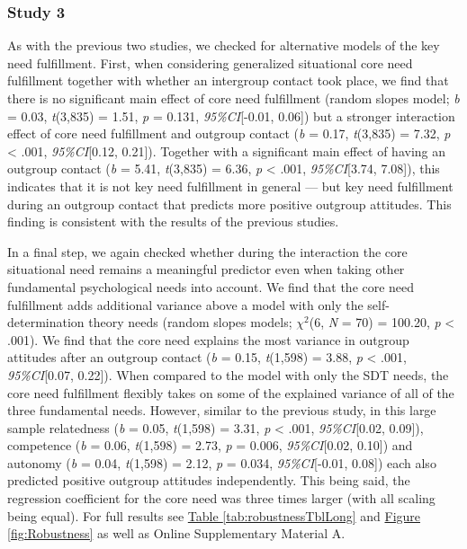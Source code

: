 \documentclass[man, 12pt, a4paper, mask]{apa7}
\theoremstyle{break}
\theoremstyle{plain}
\newcommand{\fgrref}[2][]{\hyperref[#2]{Figure \ref*{#2}#1}}
\newcommand{\tblref}[2][]{\hyperref[#2]{Table \ref*{#2}#1}}
\begin{document}
\subsubsection{Study 3}

As with the previous two studies, we checked for alternative models of
the key need fulfillment. First, when considering generalized
situational core need fulfillment together with whether an intergroup
contact took place, we find that there is no significant main effect of
core need fulfillment (random slopes model; \textit{b} = 0.03,
\textit{t}(3,835) = 1.51, \textit{p} = 0.131, \textit{95\%CI}{[}-0.01,
0.06{]}) but a stronger interaction effect of core need fulfillment and
outgroup contact (\textit{b} = 0.17, \textit{t}(3,835) = 7.32,
\textit{p} \textless{} .001, \textit{95\%CI}{[}0.12, 0.21{]}). Together
with a significant main effect of having an outgroup contact (\textit{b}
= 5.41, \textit{t}(3,835) = 6.36, \textit{p} \textless{} .001,
\textit{95\%CI}{[}3.74, 7.08{]}), this indicates that it is not key need
fulfillment in general --- but key need fulfillment during an outgroup
contact that predicts more positive outgroup attitudes. This finding is
consistent with the results of the previous studies.

In a final step, we again checked whether during the interaction the
core situational need remains a meaningful predictor even when taking
other fundamental psychological needs into account. We find that the
core need fulfillment adds additional variance above a model with only
the self-determination theory needs (random slopes models; \(\chi^2\)(6,
\textit{N} = 70) = 100.20, \textit{p} \textless{} .001). We find that
the core need explains the most variance in outgroup attitudes after an
outgroup contact (\textit{b} = 0.15, \textit{t}(1,598) = 3.88,
\textit{p} \textless{} .001, \textit{95\%CI}{[}0.07, 0.22{]}). When
compared to the model with only the SDT needs, the core need fulfillment
flexibly takes on some of the explained variance of all of the three
fundamental needs. However, similar to the previous study, in this large
sample relatedness (\textit{b} = 0.05, \textit{t}(1,598) = 3.31,
\textit{p} \textless{} .001, \textit{95\%CI}{[}0.02, 0.09{]}),
competence (\textit{b} = 0.06, \textit{t}(1,598) = 2.73, \textit{p} =
0.006, \textit{95\%CI}{[}0.02, 0.10{]}) and autonomy (\textit{b} = 0.04,
\textit{t}(1,598) = 2.12, \textit{p} = 0.034, \textit{95\%CI}{[}-0.01,
0.08{]}) each also predicted positive outgroup attitudes independently.
This being said, the regression coefficient for the core need was three
times larger (with all scaling being equal). For full results see
\tblref{tab:robustnessTblLong} and \fgrref{fig:Robustness} as well as
Online Supplementary Material A.
\end{document}
